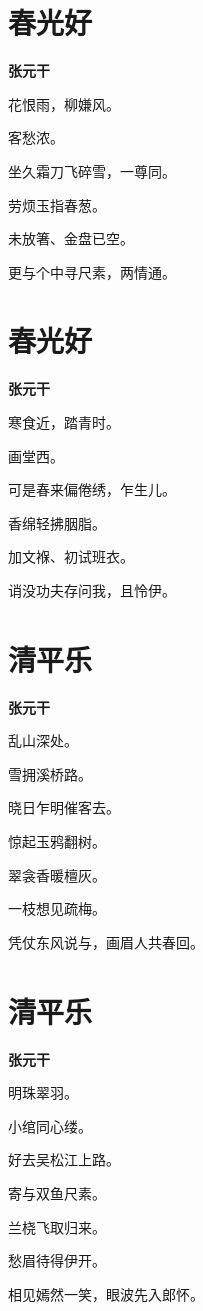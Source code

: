\documentclass[12pt,a4paper]{ctexbook}
\begin{document}
\section{春光好}
\textbf{张元干}\par\vspace{0.5em}
花恨雨，柳嫌风。\par
客愁浓。\par
坐久霜刀飞碎雪，一尊同。\par
劳烦玉指春葱。\par
未放箸、金盘已空。\par
更与个中寻尺素，两情通。\par

\section{春光好}
\textbf{张元干}\par\vspace{0.5em}
寒食近，踏青时。\par
画堂西。\par
可是春来偏倦绣，乍生儿。\par
香绵轻拂胭脂。\par
加文褓、初试班衣。\par
诮没功夫存问我，且怜伊。\par

\section{清平乐}
\textbf{张元干}\par\vspace{0.5em}
乱山深处。\par
雪拥溪桥路。\par
晓日乍明催客去。\par
惊起玉鸦翻树。\par
翠衾香暖檀灰。\par
一枝想见疏梅。\par
凭仗东风说与，画眉人共春回。\par

\section{清平乐}
\textbf{张元干}\par\vspace{0.5em}
明珠翠羽。\par
小绾同心缕。\par
好去吴松江上路。\par
寄与双鱼尺素。\par
兰桡飞取归来。\par
愁眉待得伊开。\par
相见嫣然一笑，眼波先入郎怀。\par
\end{document}
